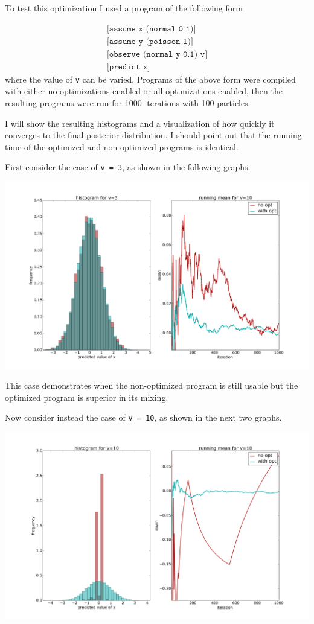 \documentclass[a4paper]{article}
\begin{document}
To test this optimization I used a program of the following form

\[
	\begin{array}{l}
		\texttt{[assume x (normal 0 1)]} \\
		\texttt{[assume y (poisson 1)]} \\
		\texttt{[observe (normal y 0.1) v]} \\
		\texttt{[predict x]}
	\end{array}
\]
where the value of \texttt{v} can be varied. Programs of the above form were compiled with either no optimizations enabled or all optimizations enabled, then the resulting programs were run for 1000 iterations with 100 particles.

I will show the resulting histograms and a visualization of how quickly it converges to the final posterior distribution. I should point out that the running time of the optimized and non-optimized programs is identical.

First consider the case of \texttt{v = 3}, as shown in the following graphs.

\centerline{\includegraphics[width=16cm]{images/pushing_samples_back_1.png}}

This case demonstrates when the non-optimized program is still usable but the optimized program is superior in its mixing.

Now consider instead the case of \texttt{v = 10}, as shown in the next two graphs.

\centerline{\includegraphics[width=16cm]{images/pushing_samples_back_2.png}}
\end{document}
